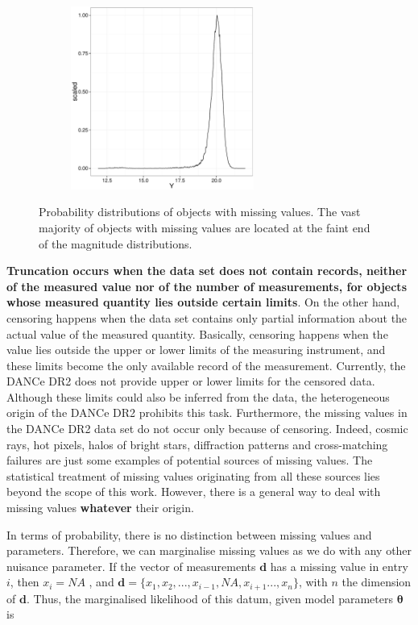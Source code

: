 \begin{figure}[ht!]
     \begin{subfigure}[t]{0.45\textwidth}
      \includegraphics[page=4,height=6cm]{background/Figures/MissingDistribution.pdf}
        \caption{}
        \label{} 
    \end{subfigure}
\caption{Probability distributions of objects with missing values. The vast majority of objects with missing values are located at the faint end of the magnitude distributions.}
\label{fig:NAsKs}
\end{figure}




\textbf{Truncation occurs when the data set does not contain records, neither of the measured value nor of the number of measurements, for objects whose measured quantity lies outside certain limits}. On the other hand, censoring happens when the data set contains only partial information about the actual value of the measured quantity. Basically,  censoring happens when the value lies outside the upper or lower limits of the measuring instrument, and these limits become the only available record of the measurement. Currently, the DANCe DR2 does not provide upper or lower limits for the censored data. Although these limits could also be inferred from the data, the heterogeneous origin of the DANCe DR2 prohibits this task. Furthermore, the missing values in the DANCe DR2 data set do not occur only because of censoring. Indeed, cosmic rays, hot pixels, halos of bright stars, diffraction patterns and cross-matching failures are just some examples of potential sources of missing values. The statistical treatment of missing values originating from all these sources lies beyond the scope of this work. However, there is a general way to deal with missing values \textbf{whatever} their origin.

In terms of probability, there is no distinction between missing values and parameters. Therefore, we can marginalise missing values as we do with any other nuisance parameter. If the vector of measurements $\mathbf{d}$ has a missing value in entry $i$, then $x_{i} = NA$ , and $\mathbf{d}=\{x_1,x_2,...,x_{i-1},NA,x_{i+1}...,x_n\}$, with $n$ the dimension of $\mathbf{d}$. Thus, the marginalised likelihood of this datum, given model parameters $\boldsymbol{\theta}$ is

